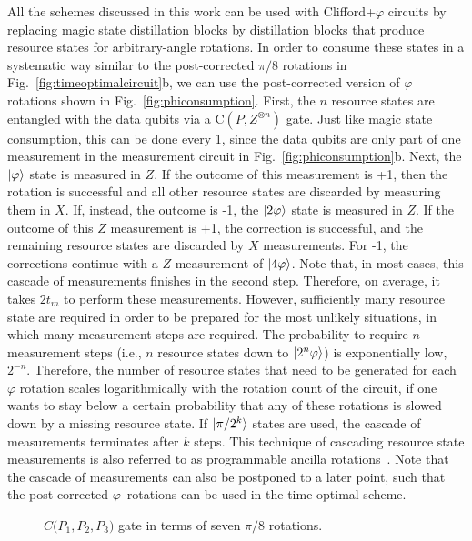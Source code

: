 \documentclass[prx,aps,letterpaper,twocolumn,allowfontchageintitle=true,accepted=2019-02-01]{quantumarticle}
\begin{document}
All the schemes discussed in this work can be used with Clifford+$\varphi$ circuits by replacing magic state distillation blocks by distillation blocks that produce resource states for arbitrary-angle rotations. In order to consume these states in a systematic way similar to the post-corrected $\pi/8$ rotations in Fig.~\ref{fig:timeoptimalcircuit}b, we can use the post-corrected version of $\varphi$ rotations shown in Fig.~\ref{fig:phiconsumption}. First, the $n$ resource states are entangled with the data qubits via a $\mathrm{C}(P,Z^{\otimes n})$ gate. Just like magic state consumption, this can be done every 1\clock, since the data qubits are only part of one measurement in the measurement circuit in Fig.~\ref{fig:phiconsumption}b. Next, the $\ket{\varphi}$ state is measured in $Z$. If the outcome of this measurement is +1, then the rotation is successful and all other resource states are discarded by measuring them in $X$. If, instead, the outcome is -1, the $\ket{2\varphi}$ state is measured in $Z$. If the outcome of this $Z$ measurement is +1, the correction is successful, and the remaining resource states are discarded by $X$ measurements. For -1, the corrections continue with a $Z$ measurement of $\ket{4\varphi}$. Note that, in most cases, this cascade of measurements finishes in the second step. Therefore, on average, it takes $2t_m$ to perform these measurements. However, sufficiently many resource state are required in order to be prepared for the most unlikely situations, in which many measurement steps are required. The probability to require $n$ measurement steps (i.e., $n$ resource states down to $\ket{2^n\varphi}$) is exponentially low, $2^{-n}$. Therefore, the number of resource states that need to be generated for each $\varphi$ rotation scales logarithmically with the rotation count of the circuit, if one wants to stay below a certain probability that any of these rotations is slowed down by a missing resource state. If $\ket{\pi/2^k}$ states are used, the cascade of measurements terminates after $k$ steps. This technique of cascading resource state measurements is also referred to as programmable ancilla rotations~\cite{Jones2012}. Note that the cascade of measurements can also be postponed to a later point, such that the post-corrected $\varphi$~rotations can be used in the time-optimal scheme.


\begin{figure}[t!]
\centering
\def\svgwidth{\linewidth}

\caption{$C\mathrm(P_1,P_2,P_3)$ gate in terms of seven $\pi/8$ rotations.}
\label{fig:ccc}
\end{figure}
\end{document}
